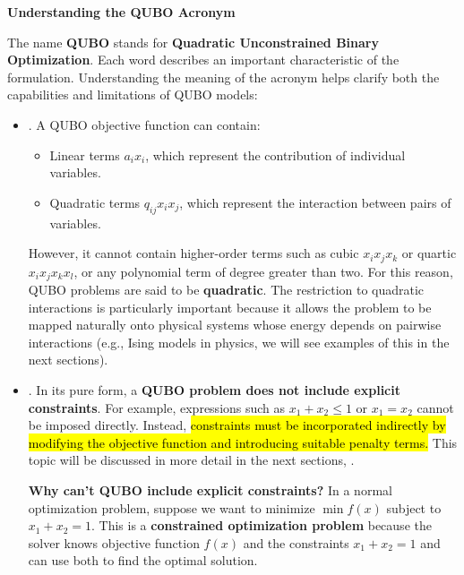 \newpage

\begin{flushleft}
    \textcolor{Green3}{ \textbf{Understanding the QUBO Acronym}}
\end{flushleft}
The name \textbf{QUBO} stands for \textbf{Quadratic Unconstrained Binary Optimization}. Each word describes an important characteristic of the formulation. Understanding the meaning of the acronym helps clarify both the capabilities and limitations of QUBO models:
\begin{itemize}
    \item {}. A QUBO objective function can contain:
    \begin{itemize}
        \item Linear terms $a_{i} x_{i}$, which represent the contribution of individual variables.
        \item Quadratic terms $q_{ij} x_{i} x_{j}$, which represent the interaction between pairs of variables.
    \end{itemize}
    However, it cannot contain higher-order terms such as cubic $x_{i} x_{j} x_{k}$ or quartic $x_{i} x_{j} x_{k} x_{l}$, or any polynomial term of degree greater than two. For this reason, QUBO problems are said to be \textbf{quadratic}. The restriction to quadratic interactions is particularly important because it allows the problem to be mapped naturally onto physical systems whose energy depends on pairwise interactions (e.g., Ising models in physics, we will see examples of this in the next sections).


    \item {}. In its pure form, a \textbf{QUBO problem does not include explicit constraints}. For example, expressions such as $x_{1} + x_{2} \leq 1$ or $x_{1} = x_{2}$ cannot be imposed directly. Instead, \hl{constraints must be incorporated indirectly by modifying the objective function and introducing suitable penalty terms.} This topic will be discussed in more detail in the next sections, .

    \textcolor{Green3}{ \textbf{Why can't QUBO include explicit constraints?}} In a normal optimization problem, suppose we want to minimize $\min f(x)$ subject to $x_1 + x_2 = 1$. This is a \textbf{constrained optimization problem} because the solver knows objective function $f(x)$ and the constraints $x_1 + x_2 = 1$ and can use both to find the optimal solution.
    

\end{itemize}
